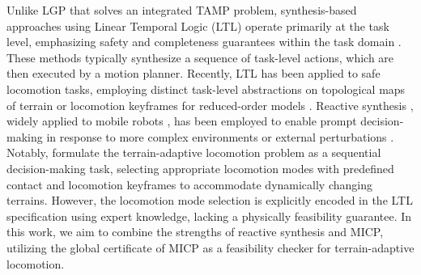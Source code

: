 Unlike LGP that solves an integrated TAMP problem, synthesis-based approaches using Linear Temporal Logic (LTL) operate primarily at the task level, emphasizing safety and completeness guarantees within the task domain \citep{kress2018synthesis}. These methods typically synthesize a sequence of task-level actions, which are then executed by a motion planner. Recently, LTL has been applied to safe locomotion tasks, employing distinct task-level abstractions on topological maps of terrain \citep{kulgod2020temporal,zhou2022reactive,jiang2023abstraction} or locomotion keyframes for reduced-order models \citep{gu2022reactive,shamsah2023integrated,zhao2022reactive}.
Reactive synthesis \citep{pnueli1989synthesis}, widely applied to mobile robots \citep{kress2009temporal}, has been employed to enable prompt decision-making in response to more complex environments \citep{shamsah2023integrated} or external perturbations \citep{gu2022reactive}. Notably, \citep{zhao2022reactive} formulate the terrain-adaptive locomotion problem as a sequential decision-making task, selecting appropriate locomotion modes with predefined contact and locomotion keyframes to accommodate dynamically changing terrains. However, the locomotion mode selection is explicitly encoded in the LTL specification using expert knowledge, lacking a physically feasibility guarantee.
In this work, we aim to combine the strengths of reactive synthesis and MICP, utilizing the global certificate of MICP as a feasibility checker for terrain-adaptive locomotion.

